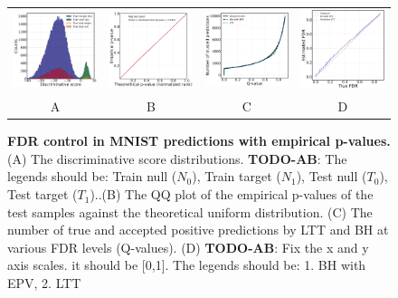\documentclass{article}
\newcommand{\todo}[2]{{\color{red} {\bf TODO-#1}: #2}}
\begin{document}
\begin{figure}
	\centering
	\begin{tabular}{cccc}
		\includegraphics[width=1.7in]{img/cls_overview.png}&
		\includegraphics[width=1.7in]{img/cnn_QQ_classical_lin.png} &
		\includegraphics[width=1.7in]{img/cnn_classical_fdr_control.png} &
		\includegraphics[width=1.7in]{img/cnn_FDRQQ_classical.png} \\
			
		A & B & C & D \\
%
	\end{tabular}
	\caption{{\bf FDR control in MNIST predictions with empirical p-values. } (A) The discriminative score distributions. \todo{AB}{The legends should be: Train null ($N_0$), Train target ($N_1$), Test null ($T_0$), Test target ($T_1$).}.(B) The QQ plot of the empirical p-values of the test samples against the theoretical uniform distribution. (C) The number of true and accepted positive predictions by LTT and BH at various FDR levels (Q-values).  (D) \todo{AB}{Fix the x and y axis scales. it should be [0,1]. The legends should be: 1. BH with EPV, 2. LTT} }
	\label{fig:binary}
\end{figure}
 
\end{document}
